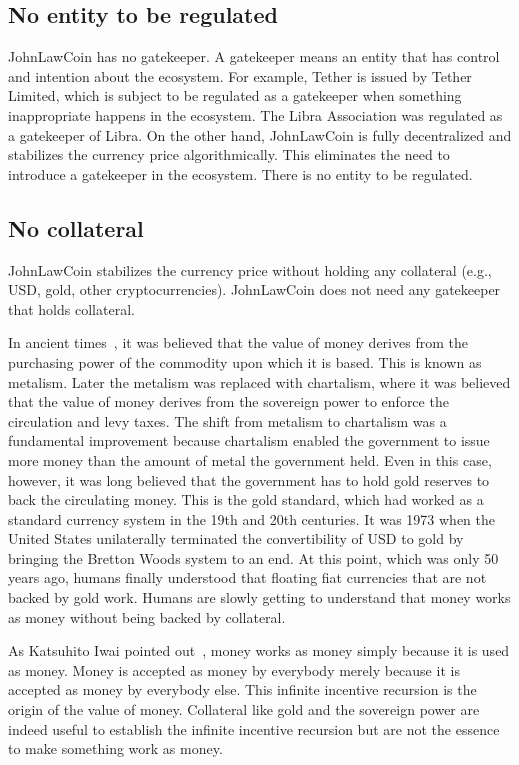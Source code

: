 \documentclass[dvipdfmx,a4paper]{article}
\begin{document}
\subsection{No entity to be regulated}

JohnLawCoin has no gatekeeper. A gatekeeper means an entity that has control and intention about the ecosystem. For example, Tether is issued by Tether Limited, which is subject to be regulated as a gatekeeper when something inappropriate happens in the ecosystem. The Libra Association was regulated as a gatekeeper of Libra. On the other hand, JohnLawCoin is fully decentralized and stabilizes the currency price algorithmically. This eliminates the need to introduce a gatekeeper in the ecosystem. There is no entity to be regulated.

\subsection{No collateral}

JohnLawCoin stabilizes the currency price without holding any collateral (e.g., USD, gold, other cryptocurrencies). JohnLawCoin does not need any gatekeeper that holds collateral.

In ancient times~\cite{davies2010history,ferguson2008ascent}, it was believed that the value of money derives from the purchasing power of the commodity upon which it is based. This is known as metalism. Later the metalism was replaced with chartalism, where it was believed that the value of money derives from the sovereign power to enforce the circulation and levy taxes. The shift from metalism to chartalism was a fundamental improvement because chartalism enabled the government to issue more money than the amount of metal the government held. Even in this case, however, it was long believed that the government has to hold gold reserves to back the circulating money. This is the gold standard, which had worked as a standard currency system in the 19th and 20th centuries. It was 1973 when the United States unilaterally terminated the convertibility of USD to gold by bringing the Bretton Woods system to an end. At this point, which was only 50 years ago, humans finally understood that floating fiat currencies that are not backed by gold work. Humans are slowly getting to understand that money works as money without being backed by collateral.

As Katsuhito Iwai pointed out~\cite{iwai1996boostrap,iwai1997evolution}, money works as money simply because it is used as money. Money is accepted as money by everybody merely because it is accepted as money by everybody else. This infinite incentive recursion is the origin of the value of money. Collateral like gold and the sovereign power are indeed useful to establish the infinite incentive recursion but are not the essence to make something work as money.
\end{document}
